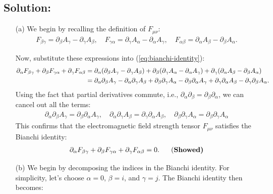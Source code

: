 \subsection*{Solution:}
\begin{enumerate}
    \item [(a)] We begin by recalling the definition of $F_{\mu\nu}$:
\begin{align}
    F_{\beta\gamma} = \partial_\beta A_\gamma - \partial_\gamma A_\beta, \quad F_{\gamma\alpha} = \partial_\gamma A_\alpha - \partial_\alpha A_\gamma, \quad F_{\alpha\beta} = \partial_\alpha A_\beta - \partial_\beta A_\alpha.
\end{align}

Now, substitute these expressions into (\ref{eq:bianchi-identity}):
\begin{align*}
    \partial_\alpha F_{\beta\gamma} + \partial_\beta F_{\gamma\alpha} + \partial_\gamma F_{\alpha\beta} &= \partial_\alpha (\partial_\beta A_\gamma - \partial_\gamma A_\beta) + \partial_\beta (\partial_\gamma A_\alpha - \partial_\alpha A_\gamma) + \partial_\gamma (\partial_\alpha A_\beta - \partial_\beta A_\alpha)\notag\\
    &=\partial_\alpha \partial_\beta A_\gamma - \partial_\alpha \partial_\gamma A_\beta+\partial_\beta \partial_\gamma A_\alpha - \partial_\beta \partial_\alpha A_\gamma+\partial_\gamma \partial_\alpha A_\beta - \partial_\gamma \partial_\beta A_\alpha.
\end{align*}
Using the fact that partial derivatives commute, i.e., $\partial_\alpha \partial_\beta = \partial_\beta \partial_\alpha$, we can cancel out all the terms:
\begin{align*}
    \partial_\alpha \partial_\beta A_\gamma = \partial_\beta \partial_\alpha A_\gamma, \quad \partial_\alpha \partial_\gamma A_\beta = \partial_\gamma \partial_\alpha A_\beta, \quad \partial_\beta \partial_\gamma A_\alpha = \partial_\beta \partial_\gamma A_\alpha
\end{align*}
This confirms that the electromagnetic field strength tensor $F_{\mu\nu}$ satisfies the Bianchi identity:
\begin{align}
    \partial_\alpha F_{\beta\gamma} + \partial_\beta F_{\gamma\alpha} + \partial_\gamma F_{\alpha\beta} = 0.~~~~~\text{(\bf Showed)}
\end{align}
\item [(b)] We begin by decomposing the indices in the Bianchi identity. For simplicity, let’s choose $\alpha = 0$, $\beta = i$, and $\gamma = j$. The Bianchi identity then becomes:

\end{enumerate}
